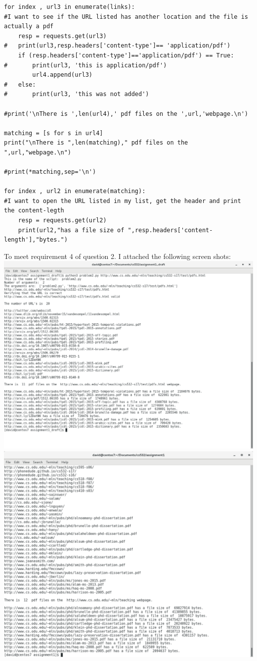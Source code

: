 \documentclass[10pt,letterpaper]{article}
\begin{document}
\cite{stackoverflow}
\begin{lstlisting}
for index , url3 in enumerate(links):
#I want to see if the URL listed has another location and the file is actually a pdf
	resp = requests.get(url3)
#	print(url3,resp.headers['content-type']== 'application/pdf')
	if (resp.headers['content-type']=='application/pdf') == True:
#		print(url3, 'this is application/pdf')
		url4.append(url3)
#	else:
#		print(url3, 'this was not added')	

#print('\nThere is ',len(url4),' pdf files on the ',url,'webpage.\n')

matching = [s for s in url4]
print("\nThere is ",len(matching)," pdf files on the ",url,"webpage.\n")

#print(*matching,sep='\n')

for index , url2 in enumerate(matching):
#I want to open the URL listed in my list, get the header and print the content-legth
	resp = requests.get(url2)
	print(url2,"has a file size of ",resp.headers['content-length'],"bytes.")

\end{lstlisting}
To meet requirement 4 of question 2. I attached the following screen shots:\\
\includegraphics[scale=.25]{problem2req4a.png}
\includegraphics[scale=.25]{problem2req4c.png}
\end{document}
